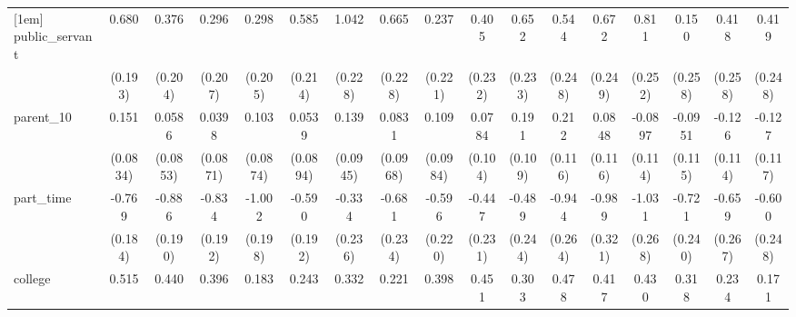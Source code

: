 {\begin{tabular}{l*{16}{c}}
[1em]
public\_servant      &       0.680\sym{***}&       0.376         &       0.296         &       0.298         &       0.585\sym{**} &       1.042\sym{***}&       0.665\sym{**} &       0.237         &       0.405         &       0.652\sym{**} &       0.544\sym{*}  &       0.672\sym{**} &       0.811\sym{**} &       0.150         &       0.418         &       0.419         \\
                    &     (0.193)         &     (0.204)         &     (0.207)         &     (0.205)         &     (0.214)         &     (0.228)         &     (0.228)         &     (0.221)         &     (0.232)         &     (0.233)         &     (0.248)         &     (0.249)         &     (0.252)         &     (0.258)         &     (0.258)         &     (0.248)         \\
[1em]
parent\_10           &       0.151         &      0.0586         &      0.0398         &       0.103         &      0.0539         &       0.139         &      0.0831         &       0.109         &      0.0784         &       0.191         &       0.212         &      0.0848         &     -0.0897         &     -0.0951         &      -0.126         &      -0.127         \\
                    &    (0.0834)         &    (0.0853)         &    (0.0871)         &    (0.0874)         &    (0.0894)         &    (0.0945)         &    (0.0968)         &    (0.0984)         &     (0.104)         &     (0.109)         &     (0.116)         &     (0.116)         &     (0.114)         &     (0.115)         &     (0.114)         &     (0.117)         \\
[1em]
part\_time           &      -0.769\sym{***}&      -0.886\sym{***}&      -0.834\sym{***}&      -1.002\sym{***}&      -0.590\sym{**} &      -0.334         &      -0.681\sym{**} &      -0.596\sym{**} &      -0.447         &      -0.489\sym{*}  &      -0.944\sym{***}&      -0.989\sym{**} &      -1.031\sym{***}&      -0.721\sym{**} &      -0.659\sym{*}  &      -0.600\sym{*}  \\
                    &     (0.184)         &     (0.190)         &     (0.192)         &     (0.198)         &     (0.192)         &     (0.236)         &     (0.234)         &     (0.220)         &     (0.231)         &     (0.244)         &     (0.264)         &     (0.321)         &     (0.268)         &     (0.240)         &     (0.267)         &     (0.248)         \\
[1em]
college             &       0.515\sym{***}&       0.440\sym{***}&       0.396\sym{***}&       0.183         &       0.243\sym{*}  &       0.332\sym{**} &       0.221         &       0.398\sym{**} &       0.451\sym{***}&       0.303\sym{*}  &       0.478\sym{**} &       0.417\sym{**} &       0.430\sym{**} &       0.318\sym{*}  &       0.234         &       0.171         \\

\end{tabular}}
